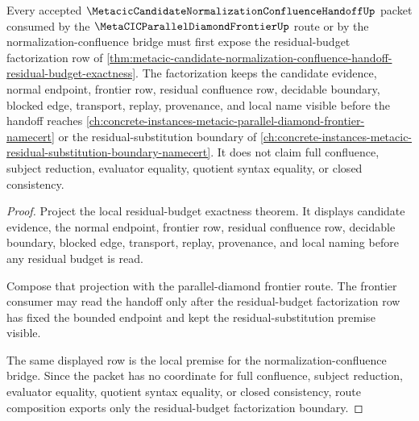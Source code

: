\begin{theorem}
\label{thm:metacic-candidate-normalization-confluence-handoff-route-factorization}
Every accepted $\MetacicCandidateNormalizationConfluenceHandoffUp$ packet consumed by the $\MetaCICParallelDiamondFrontierUp$ route or by the normalization-confluence bridge must first expose the residual-budget factorization row of \autoref{thm:metacic-candidate-normalization-confluence-handoff-residual-budget-exactness}. The factorization keeps the candidate evidence, normal endpoint, frontier row, residual confluence row, decidable boundary, blocked edge, transport, replay, provenance, and local name visible before the handoff reaches \autoref{ch:concrete-instances-metacic-parallel-diamond-frontier-namecert} or the residual-substitution boundary of \autoref{ch:concrete-instances-metacic-residual-substitution-boundary-namecert}. It does not claim full confluence, subject reduction, evaluator equality, quotient syntax equality, or closed consistency.
\end{theorem}
\begin{proof}
Project the local residual-budget exactness theorem. It displays candidate evidence, the normal endpoint, frontier row, residual confluence row, decidable boundary, blocked edge, transport, replay, provenance, and local naming before any residual budget is read.

Compose that projection with the parallel-diamond frontier route. The frontier consumer may read the handoff only after the residual-budget factorization row has fixed the bounded endpoint and kept the residual-substitution premise visible.

The same displayed row is the local premise for the normalization-confluence bridge. Since the packet has no coordinate for full confluence, subject reduction, evaluator equality, quotient syntax equality, or closed consistency, route composition exports only the residual-budget factorization boundary.
\end{proof}

